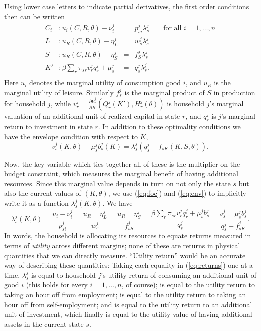 \documentclass[11pt]{article}
\newcommand{\Eq}[1]{(\ref{eq:#1})}
\begin{document}
Using lower case letters to indicate partial derivatives, the first order conditions then can be written
\begin{equation}
\label{eq:foc}
\begin{aligned}
  C_i &: u_i(C,R,\theta) - \nu^j_i &=& p^j_{si}\lambda^j_s \qquad\text{for all $i=1,\dots,n$}\\
  L   &: u_R(C,R,\theta) - \eta^j_L &=& w^j_s\lambda^j_s\\ 
  S   &: u_R(C,R,\theta) - \eta^j_S &=& f^j_{S}\lambda^j_s \\
  K'  &: \beta\sum_r\pi_{sr}v^j_{r}q^j_{r} + \mu^j_s &=& q^j_{s}\lambda^j_s.\\
\end{aligned}
\end{equation}
Here $u_i$ denotes the marginal utility of consumption good $i$, and $u_R$
is the marginal utility of leisure.  Similarly $f^j_{s}$ is the marginal
product of $S$ in production for household \(j\), while $v^j_{r}=\frac{\partial
   V^j_{r}}{\partial K}(Q^j_{r}(K'),H^j_{r}(\theta))$ is household \(j\)'s
marginal valuation of an additional unit of realized capital in state
$r$, and $q^j_{r}$ is \(j\)'s marginal return to investment in state
$r$.  In addition to these optimality conditions we have the envelope
condition with respect to $K$,
\begin{equation}
\label{eq:env}
  v^j_{s}(K,\theta) - \mu^j_sb^j_s(K) = \lambda^j_s\left(q^j_s + f_{sK}(K,S,\theta)\right).
\end{equation}

Now, the key variable which ties together all of these is the
multiplier on the budget constraint, which measures the marginal
benefit of having additional resources.  Since this marginal value
depends in turn on not only the state $s$ but also the current values
of $(K,\theta)$, we use \Eq{foc} and \Eq{env} to implicitly write it as a
function $\lambda^j_s(K,\theta)$.  We have
\begin{equation}
\label{eq:returns}
   \lambda^j_s(K,\theta) = \frac{u_i - \nu^j_i}{p^j_{si}} = \frac{u_R - \eta^j_L}{w^j_s} =
   \frac{u_R-\eta^j_S}{f^j_{sS}}=\frac{\beta\sum_r\pi_{sr}v^j_{r}q^j_{r} +
     \mu^j_sb^j_s}{q^j_s} = \frac{v^j_{s}-\mu^j_sb^j_s}{q^j_s + f^j_{sK}}.
\end{equation}
In words, the household is allocating its resources to equate returns
measured in terms of \emph{utility} across different margins; none of
these are returns in physical quantities that we can directly measure.
``Utility return'' would be an accurate way of describing these
quantities: Taking each equality in \Eq{returns} one at a
time, $\lambda^j_s$ is equal to household \(j\)'s utility return of
consuming an additional unit of good $i$ (this holds for every
$i=1,\dots,n$, of course); is equal to the utility return to taking an
hour off from employment; is equal to the utility return to taking an
hour off from self-employment; and is equal to the utility return to
an additional unit of investment, which finally is equal to the
utility value of having additional assets in the current state $s$.
\end{document}
